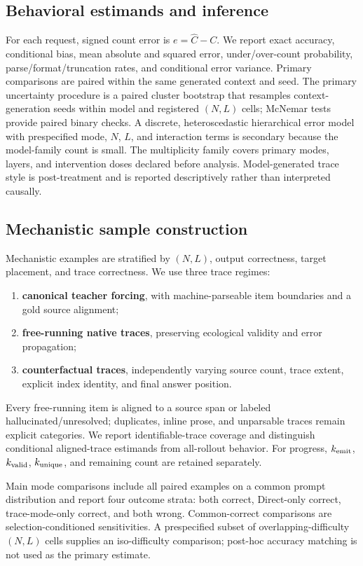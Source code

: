 \documentclass[11pt]{article}
\newcommand{\gold}{C}
\newcommand{\pred}{\widehat C}
\begin{document}
\subsection{Behavioral estimands and inference}

For each request, signed count error is $e=\pred-\gold$. We report exact accuracy, conditional bias, mean absolute and squared error, under/over-count probability, parse/format/truncation rates, and conditional error variance. Primary comparisons are paired within the same generated context and seed. The primary uncertainty procedure is a paired cluster bootstrap that resamples context-generation seeds within model and registered $(N,L)$ cells; McNemar tests provide paired binary checks. A discrete, heteroscedastic hierarchical error model with prespecified mode, $N$, $L$, and interaction terms is secondary because the model-family count is small. The multiplicity family covers primary modes, layers, and intervention doses declared before analysis. Model-generated trace style is post-treatment and is reported descriptively rather than interpreted causally.

\subsection{Mechanistic sample construction}

Mechanistic examples are stratified by $(N,L)$, output correctness, target placement, and trace correctness. We use three trace regimes:
\begin{enumerate}
  \item \textbf{canonical teacher forcing}, with machine-parseable item boundaries and a gold source alignment;
  \item \textbf{free-running native traces}, preserving ecological validity and error propagation;
  \item \textbf{counterfactual traces}, independently varying source count, trace extent, explicit index identity, and final answer position.
\end{enumerate}
Every free-running item is aligned to a source span or labeled hallucinated/unresolved; duplicates, inline prose, and unparsable traces remain explicit categories. We report identifiable-trace coverage and distinguish conditional aligned-trace estimands from all-rollout behavior. For progress, $k_{\rm emit}$, $k_{\rm valid}$, $k_{\rm unique}$, and remaining count are retained separately.

Main mode comparisons include all paired examples on a common prompt distribution and report four outcome strata: both correct, Direct-only correct, trace-mode-only correct, and both wrong. Common-correct comparisons are selection-conditioned sensitivities. A prespecified subset of overlapping-difficulty $(N,L)$ cells supplies an iso-difficulty comparison; post-hoc accuracy matching is not used as the primary estimate.
\end{document}
